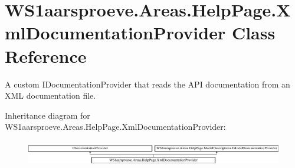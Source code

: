 \hypertarget{class_w_s1aarsproeve_1_1_areas_1_1_help_page_1_1_xml_documentation_provider}{}\section{W\+S1aarsproeve.\+Areas.\+Help\+Page.\+Xml\+Documentation\+Provider Class Reference}
\label{class_w_s1aarsproeve_1_1_areas_1_1_help_page_1_1_xml_documentation_provider}


A custom I\+Documentation\+Provider that reads the A\+P\+I documentation from an X\+M\+L documentation file.  


Inheritance diagram for W\+S1aarsproeve.\+Areas.\+Help\+Page.\+Xml\+Documentation\+Provider\+:\begin{figure}[H]
\begin{center}
\leavevmode
\includegraphics[height=1.140530cm]{class_w_s1aarsproeve_1_1_areas_1_1_help_page_1_1_xml_documentation_provider}
\end{center}
\end{figure}
